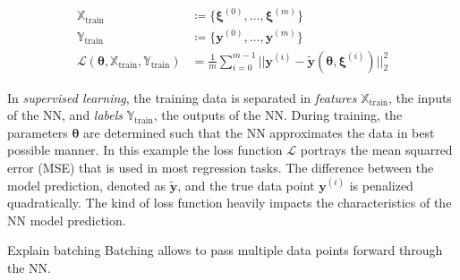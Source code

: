 \begin{equation}
    \label{eq: loss function}
    \begin{aligned}
        \mathbb{X}_\text{train} &\coloneq \{ \bm{\xi}^{(0)}, \hdots, \bm{\xi}^{(m)} \}
        \\
        \mathbb{Y}_\text{train} &\coloneq \{ \bm{y}^{(0)}, \hdots, \bm{y}^{(m)} \} 
        \\
        \mathcal{L}(\bm{\theta}, \mathbb{X}_\text{train}, \mathbb{Y}_\text{train}) &=
        \frac{1}{m} \sum_{i=0}^{m-1} \Big| \Big| \bm{y}^{(i)} - \bm{\tilde{y}}(\bm{\theta}, \bm{\xi}^{(i)}) \Big | \Big|_2^2
    \end{aligned}
\end{equation}

In \emph{supervised learning}, the training data is separated in \emph{features} $\mathbb{X}_\text{train}$, the inputs of the NN,
and \emph{labels} $\mathbb{Y}_\text{train}$, the outputs of the NN. During training, the parameters $\bm{\theta}$ are determined such that
the NN approximates the data in best possible manner.
In this example the loss function $\mathcal{L}$ portrays the mean squarred error (MSE) that is used in most regression tasks. 
The difference between the model prediction, denoted as $\bm{\tilde{y}}$, and the true data point $\bm{y}^{(i)}$ is penalized quadratically.
The kind of loss function heavily impacts the characteristics of the NN model prediction.

Explain batching
Batching allows to pass multiple data points forward
through the NN.

